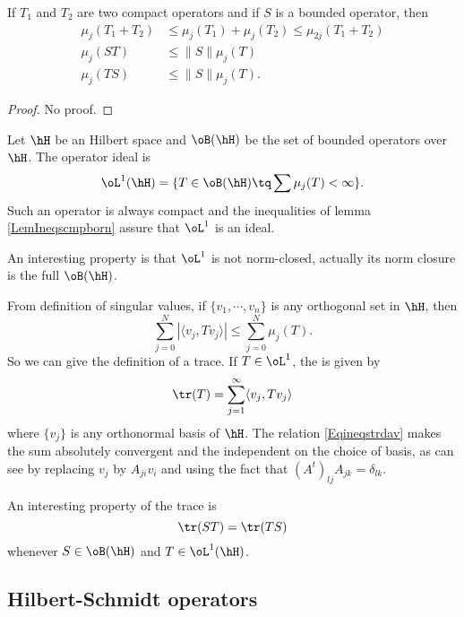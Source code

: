 \begin{lemma}	\label{LemIneqscmpborn}
If $T_1$ and $T_2$ are two compact operators and if $S$ is a bounded operator, then
\begin{align*}
\mu_j(T_1+T_2)&\leq \mu_j(T_1)+\mu_j(T_2)\leq\mu_{2j}(T_1+T_2)\\
\mu_j(ST)&\leq\| S \|\mu_j(T)\\
\mu_j(TS)&\leq\| S \|\mu_j(T).
\end{align*}

\end{lemma}
\begin{proof}
No proof.
\end{proof}

Let $\hH$ be an Hilbert space and $\oB(\hH)$ be the set of bounded operators over $\hH$. The  operator ideal is
\begin{equation}
	\oL^1(\hH)=\{ T\in\oB(\hH)\tq \sum\mu_j(T)<\infty \}.
\end{equation}
Such an operator is always compact and the inequalities of lemma \ref{LemIneqscmpborn} assure that $\oL^1$ is an ideal.

An interesting property is that $\oL^1$ is not norm-closed, actually its norm closure is the full $\oB(\hH)$.

From definition of singular values, if $\{ v_1,\cdots,v_n \}$ is any orthogonal set in $\hH$, then
\begin{equation}	\label{Eqineqstrdav}
  \sum_{j=0}^N| \langle v_j, Tv_j\rangle  |\leq \sum_{j=0}^{N}\mu_j(T).
\end{equation}
So we can give the definition of a trace. If $T\in\oL^1$, the  is given by
\begin{equation}
\tr(T)=\sum_{j=1}^{\infty}\langle v_j, Tv_j\rangle
\end{equation}
where $\{ v_j \}$ is any orthonormal basis of $\hH$. The relation \eqref{Eqineqstrdav} makes the sum absolutely convergent and the independent on the choice of basis, as can see by replacing $v_j$ by $A_{ji}v_i$ and using the fact that $(A^t)_{lj}A_{jk}=\delta_{lk}$.

An interesting property of the trace is
\begin{equation}
\tr(ST)=\tr(TS)
\end{equation}
whenever $S\in\oB(\hH)$ and $T\in\oL^1(\hH)$.

\subsection{Hilbert-Schmidt operators}

